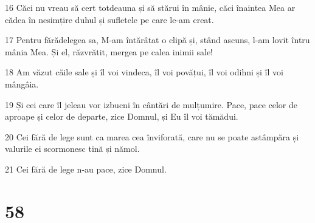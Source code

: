 \par 16 Căci nu vreau să cert totdeauna și să stărui în mânie, căci înaintea Mea ar cădea în nesimțire duhul și sufletele pe care le-am creat.
\par 17 Pentru fărădelegea sa, M-am întărâtat o clipă și, stând ascuns, l-am lovit întru mânia Mea. Și el, răzvrătit, mergea pe calea inimii sale!
\par 18 Am văzut căile sale și îl voi vindeca, îl voi povățui, îl voi odihni și îl voi mângâia.
\par 19 Și cei care îl jeleau vor izbucni în cântări de mulțumire. Pace, pace celor de aproape și celor de departe, zice Domnul, și Eu îl voi tămădui.
\par 20 Cei fără de lege sunt ca marea cea înviforată, care nu se poate astâmpăra și valurile ei scormonesc tină și nămol.
\par 21 Cei fără de lege n-au pace, zice Domnul.

\chapter{58}

